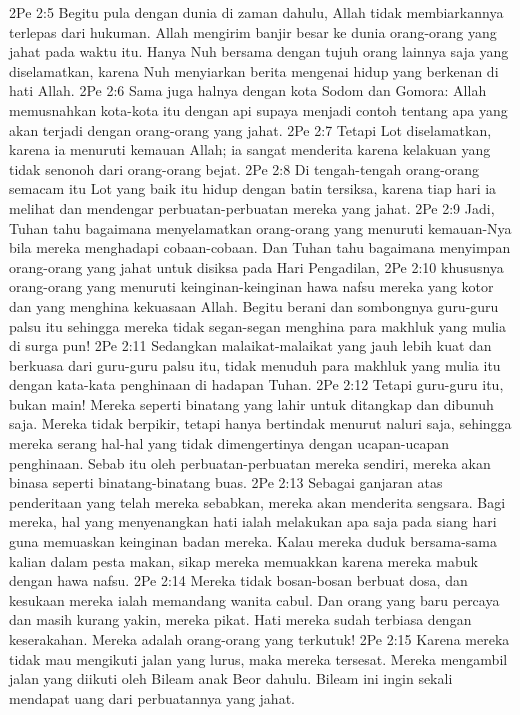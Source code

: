 2Pe 2:5  Begitu pula dengan dunia di zaman dahulu, Allah tidak membiarkannya terlepas dari hukuman. Allah mengirim banjir besar ke dunia orang-orang yang jahat pada waktu itu. Hanya Nuh bersama dengan tujuh orang lainnya saja yang diselamatkan, karena Nuh menyiarkan berita mengenai hidup yang berkenan di hati Allah.
2Pe 2:6  Sama juga halnya dengan kota Sodom dan Gomora: Allah memusnahkan kota-kota itu dengan api supaya menjadi contoh tentang apa yang akan terjadi dengan orang-orang yang jahat.
2Pe 2:7  Tetapi Lot diselamatkan, karena ia menuruti kemauan Allah; ia sangat menderita karena kelakuan yang tidak senonoh dari orang-orang bejat.
2Pe 2:8  Di tengah-tengah orang-orang semacam itu Lot yang baik itu hidup dengan batin tersiksa, karena tiap hari ia melihat dan mendengar perbuatan-perbuatan mereka yang jahat.
2Pe 2:9  Jadi, Tuhan tahu bagaimana menyelamatkan orang-orang yang menuruti kemauan-Nya bila mereka menghadapi cobaan-cobaan. Dan Tuhan tahu bagaimana menyimpan orang-orang yang jahat untuk disiksa pada Hari Pengadilan,
2Pe 2:10  khususnya orang-orang yang menuruti keinginan-keinginan hawa nafsu mereka yang kotor dan yang menghina kekuasaan Allah. Begitu berani dan sombongnya guru-guru palsu itu sehingga mereka tidak segan-segan menghina para makhluk yang mulia di surga pun!
2Pe 2:11  Sedangkan malaikat-malaikat yang jauh lebih kuat dan berkuasa dari guru-guru palsu itu, tidak menuduh para makhluk yang mulia itu dengan kata-kata penghinaan di hadapan Tuhan.
2Pe 2:12  Tetapi guru-guru itu, bukan main! Mereka seperti binatang yang lahir untuk ditangkap dan dibunuh saja. Mereka tidak berpikir, tetapi hanya bertindak menurut naluri saja, sehingga mereka serang hal-hal yang tidak dimengertinya dengan ucapan-ucapan penghinaan. Sebab itu oleh perbuatan-perbuatan mereka sendiri, mereka akan binasa seperti binatang-binatang buas.
2Pe 2:13  Sebagai ganjaran atas penderitaan yang telah mereka sebabkan, mereka akan menderita sengsara. Bagi mereka, hal yang menyenangkan hati ialah melakukan apa saja pada siang hari guna memuaskan keinginan badan mereka. Kalau mereka duduk bersama-sama kalian dalam pesta makan, sikap mereka memuakkan karena mereka mabuk dengan hawa nafsu.
2Pe 2:14  Mereka tidak bosan-bosan berbuat dosa, dan kesukaan mereka ialah memandang wanita cabul. Dan orang yang baru percaya dan masih kurang yakin, mereka pikat. Hati mereka sudah terbiasa dengan keserakahan. Mereka adalah orang-orang yang terkutuk!
2Pe 2:15  Karena mereka tidak mau mengikuti jalan yang lurus, maka mereka tersesat. Mereka mengambil jalan yang diikuti oleh Bileam anak Beor dahulu. Bileam ini ingin sekali mendapat uang dari perbuatannya yang jahat.
